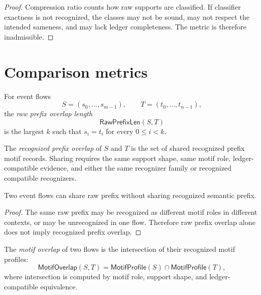 \begin{proof}
Compression ratio counts how raw supports are classified. If classifier exactness is not recognized, the classes may not be sound, may not respect the intended sameness, and may lack ledger completeness. The metric is therefore inadmissible.
\end{proof}

\section{Comparison metrics}
\label{sec:metric-report-comparison-metrics}

\begin{definition}
\label{def:metric-report-raw-prefix-overlap}
For event flows
$$
  S=(s_0,\ldots,s_{m-1}),
  \qquad
  T=(t_0,\ldots,t_{n-1}),
$$
the \emph{raw prefix overlap length}
$$
  \mathsf{RawPrefixLen}(S,T)
$$
is the largest $k$ such that $s_i=t_i$ for every $0\le i<k$.
\end{definition}

\begin{definition}
\label{def:metric-report-recognized-prefix-overlap}
The \emph{recognized prefix overlap} of $S$ and $T$ is the set of shared recognized prefix motif records. Sharing requires the same support shape, same motif role, ledger-compatible evidence, and either the same recognizer family or recognized compatible recognizers.
\end{definition}

\begin{proposition}
\label{prop:metric-report-raw-prefix-not-recognized-prefix}
Two event flows can share raw prefix without sharing recognized semantic prefix.
\end{proposition}

\begin{proof}
The same raw prefix may be recognized as different motif roles in different contexts, or may be unrecognized in one flow. Therefore raw prefix overlap alone does not imply recognized prefix overlap.
\end{proof}

\begin{definition}
\label{def:metric-report-motif-overlap}
The \emph{motif overlap} of two flows is the intersection of their recognized motif profiles:
$$
  \mathsf{MotifOverlap}(S,T)
  =
  \mathsf{MotifProfile}(S)\cap\mathsf{MotifProfile}(T),
$$
where intersection is computed by motif role, support shape, and ledger-compatible equivalence.
\end{definition}

